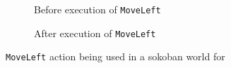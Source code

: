 \documentclass[\master/Master.tex]{subfiles}
\begin{document}
\begin{figure}
	\hspace*{0.1\textwidth}%
	\begin{subfigure}{0.35\textwidth}
		\centering
		\resizebox{\linewidth}{!}{}
		\caption{Before execution of \texttt{MoveLeft}}
	\end{subfigure}%
	\hspace*{0.1\textwidth}%
	\begin{subfigure}{0.35\textwidth}
		\centering
		\resizebox{\linewidth}{!}{}
		\caption{After execution of \texttt{MoveLeft}}
	\end{subfigure}
	\hspace*{0.1\textwidth}
	\caption{\label{fig:ca:sokoban-moveleft-action}\texttt{MoveLeft} action being used in a sokoban world for  }
	
\end{figure}
\end{document}
